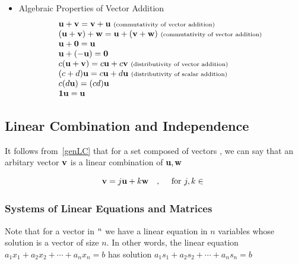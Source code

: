 \documentclass[english,course]{Notes}
\begin{document}

\begin{itemize}
	\item []Algebraic Properties of Vector Addition
	      $$\begin{array}{l}{\mathbf{u}+\mathbf{v}=\mathbf{v}+\mathbf{u} \text { \scriptsize (commutativity of vector addition) }} \\ {(\mathbf{u}+\mathbf{v})+\mathbf{w}=\mathbf{u}+(\mathbf{v}+\mathbf{w}) \text { \scriptsize(commutativity of vector addition) }} \\ {\mathbf{u}+\mathbf{0}=\mathbf{u}} \\ {\mathbf{u}+(-\mathbf{u})=\mathbf{0}} \\ {c(\mathbf{u}+\mathbf{v})=c \mathbf{u}+c \mathbf{v} \text { \scriptsize(distributivity of vector addition) }} \\ {(c+d) \mathbf{u}=c \mathbf{u}+d \mathbf{u} \text { \scriptsize(distributivity of scalar addition) }} \\ {c(d \mathbf{u})=(c d) \mathbf{u}} \\ {\mathbf{1} \mathbf{u}=\mathbf{u}}\end{array}
	      $$\end{itemize}
	      
	      \subsection{Linear Combination and Independence}
	      
	      
	      \par{It follows from~\ref{genLC} that for a set composed of vectors , we can say that an arbitary vector $\mathbf{v}$ is a linear combination of $\mathbf{u} , \mathbf{w}$ }
	      
	      $$ \vc{v} = j\vc{u} + k\vc{w} \quad , \quad \text{ for } j, k \in \real~\label{lc}$$
	      
	      \subsubsection{Systems of Linear Equations and Matrices}
	      
	      \par{Note that for a vector in $\real^{n}$ we have a linear equation in $n$ variables whose solution is  a vector of size $n$. In other words, the linear equation $a_{1} x_{1}+a_{2} x_{2}+\cdots + a_{n} x_{n}=b$ has solution $a_{1} s_{1}+a_{2} s_{2}+\cdots +a_{n} s_{n}=b$}
	      
\end{document}
